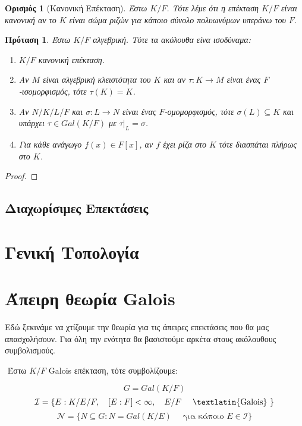 \documentclass[oneside,a4paper]{article}
\newtheorem*{defn}{Ορισμός}
\newtheorem{prop}{Πρόταση}
\newcommand {\tl}{\textlatin}
\begin{document}
\begin{defn}[Κανονική Επέκταση] Έστω $K/F$. Τότε λέμε ότι η επέκταση $K/F$ είναι κανονική αν το $K$ είναι σώμα ριζών για κάποιο σύνολο πολυωνύμων υπεράνω του $F$.
\end{defn}

\begin{prop}%
	Έστω $K/F$ αλγεβρική. Τότε τα ακόλουθα είνα ισοδύναμα:
	\begin{enumerate}
		\item $K/F$ κανονική επέκταση.
		\item Αν $M$ είναι αλγεβρική κλειστότητα του $K$ και αν $\tau : K \rightarrow M$ είναι ένας $F$-ισομορφισμός, τότε $\tau(K) = K$. %
		\item Αν $N/K/L/F$ και $\sigma : L \rightarrow N$ είναι ένας $F$-ομομορφισμός, τότε $\sigma(L) \subseteq K$ και υπάρχει $\tau \in Gal(K/F)$ με $\tau|_L = \sigma$.
		\item Για κάθε ανάγωγο $f(x) \in F[x]$, αν $f$ έχει ρίζα στο $K$ τότε διασπάται πλήρως στο $K$.
	\end{enumerate}
\end{prop}

\begin{proof}
\end{proof}

\subsection{Διαχωρίσιμες Επεκτάσεις}




\pagebreak
\section{Γενική Τοπολογία}
\pagebreak
\section{Άπειρη θεωρία \tl{Galois}}
\vspace{1cm}

Εδώ ξεκινάμε να χτίζουμε την θεωρία για τις άπειρες επεκτάσεις που θα μας απασχολήσουν. Για όλη την ενότητα θα βασιστούμε αρκέτα στους ακόλουθους συμβολισμούς.

$ $\newline
\noindent Έστω $K/F$ \tl{Galois} επέκταση, τότε συμβολίζουμε:

$$G=Gal(K/F)$$
$$\mathcal{I} = \{ E: K/E/F , \quad [E:F]<\infty , \quad E/F \quad\text{ \tl{Galois} } \}$$
$$\mathcal{N} = \{N \subseteq G: N = Gal(K/E) \quad\text{ για κάποιo } E \in \mathcal{I} \}$$
\end{document}
